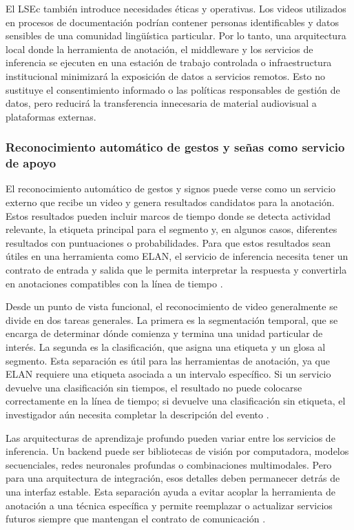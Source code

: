 \documentclass[11pt,a4paper]{article}
\begin{document}
El LSEc también introduce necesidades éticas y operativas. Los videos utilizados en procesos de documentación podrían contener personas identificables y datos sensibles de una comunidad lingüística particular. Por lo tanto, una arquitectura local donde la herramienta de anotación, el middleware y los servicios de inferencia se ejecuten en una estación de trabajo controlada o infraestructura institucional minimizará la exposición de datos a servicios remotos. Esto no sustituye el consentimiento informado o las políticas responsables de gestión de datos, pero reducirá la transferencia innecesaria de material audiovisual a plataformas externas\cite{shi2016edge}.

\subsubsection{Reconocimiento automático de gestos y señas como servicio de apoyo}

El reconocimiento automático de gestos y signos puede verse como un servicio externo que recibe un video y genera resultados candidatos para la anotación. Estos resultados pueden incluir marcos de tiempo donde se detecta actividad relevante, la etiqueta principal para el segmento y, en algunos casos, diferentes resultados con puntuaciones o probabilidades. Para que estos resultados sean útiles en una herramienta como ELAN, el servicio de inferencia necesita tener un contrato de entrada y salida que le permita interpretar la respuesta y convertirla en anotaciones compatibles con la línea de tiempo \cite{auer2014avatech}.

Desde un punto de vista funcional, el reconocimiento de video generalmente se divide en dos tareas generales. La primera es la segmentación temporal, que se encarga de determinar dónde comienza y termina una unidad particular de interés. La segunda es la clasificación, que asigna una etiqueta y un glosa al segmento. Esta separación es útil para las herramientas de anotación, ya que ELAN requiere una etiqueta asociada a un intervalo específico. Si un servicio devuelve una clasificación sin tiempos, el resultado no puede colocarse correctamente en la línea de tiempo; si devuelve una clasificación sin etiqueta, el investigador aún necesita completar la descripción del evento \cite{guevara2022lsec_interprete,cruz2025prototipo}.

Las arquitecturas de aprendizaje profundo pueden variar entre los servicios de inferencia. Un backend puede ser bibliotecas de visión por computadora, modelos secuenciales, redes neuronales profundas o combinaciones multimodales. Pero para una arquitectura de integración, esos detalles deben permanecer detrás de una interfaz estable. Esta separación ayuda a evitar acoplar la herramienta de anotación a una técnica específica y permite reemplazar o actualizar servicios futuros siempre que mantengan el contrato de comunicación \cite{fielding2000rest}.
\end{document}
